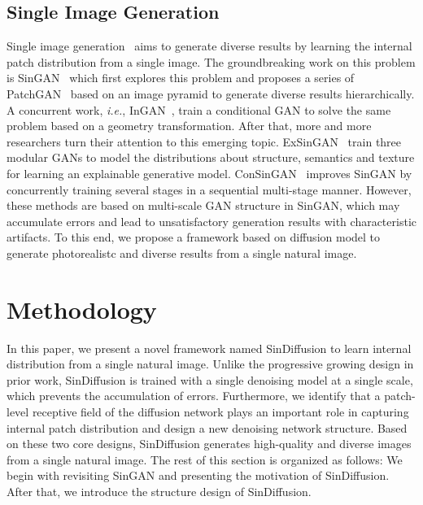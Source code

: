\documentclass[10pt,twocolumn,letterpaper]{article}
\begin{document}
\subsection{Single Image Generation}
Single image generation~\cite{shocher2019ingan, hinz2021improved, zhang2021exsingan, granot2022drop, zhang2022petsgan, lin2020tuigan, asano2019critical, yoo2021sinir, chen2021mogan, sun2020esingan, zheng2021patchwise, sushko2021generating} aims to generate diverse results by learning the internal patch distribution from a single image. 
The groundbreaking work on this problem is SinGAN~\cite{shaham2019singan} which first explores this problem and proposes a series of PatchGAN~\cite{isola2017image} based on an image pyramid to generate diverse results hierarchically.
A concurrent work, \emph{i.e.}, InGAN~\cite{shocher2019ingan}, train a conditional GAN to solve the same problem based on a geometry transformation.
After that, more and more researchers turn their attention to this emerging topic.
ExSinGAN~\cite{zhang2021exsingan} train three modular GANs to model the distributions about structure, semantics and texture for learning an explainable generative model.
ConSinGAN~\cite{hinz2021improved} improves SinGAN by concurrently training several stages in a sequential multi-stage manner.
However, these methods are based on multi-scale GAN structure in SinGAN, which may accumulate errors and lead to unsatisfactory generation results with characteristic artifacts.
To this end, we propose a framework based on diffusion model to generate photorealistc and diverse results from a single natural image.

\section{Methodology}
In this paper, we present a novel framework named SinDiffusion to learn internal distribution from a single natural image.
Unlike the progressive growing design in prior work, SinDiffusion is trained with a single denoising model at a single scale, which prevents the accumulation of errors.
Furthermore, we identify that a patch-level receptive field of the diffusion network plays an important role in capturing internal patch distribution and design a new denoising network structure.
Based on these two core designs, SinDiffusion generates high-quality and diverse images from a single natural image.
The rest of this section is organized as follows: 
We begin with revisiting SinGAN and presenting the motivation of SinDiffusion. 
After that, we introduce the structure design of SinDiffusion. 
\end{document}
